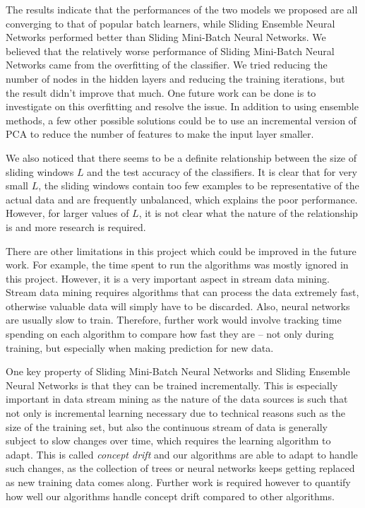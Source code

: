 \documentclass[conference]{IEEEtran}
\begin{document}
		The results indicate that the performances of the two models we proposed are all converging to that of popular batch learners, while Sliding Ensemble Neural Networks performed better than Sliding Mini-Batch Neural Networks. We believed that the relatively worse performance of  Sliding Mini-Batch Neural Networks came from the overfitting of the classifier. We tried reducing the number of nodes in the hidden layers and reducing the training iterations, but the result didn't improve that much. One future work can be done is to investigate on this overfitting and resolve the issue. In addition to using ensemble methods, a few other possible solutions could be to use an incremental version of PCA to reduce the number of features to make the input layer smaller.
		
		We also noticed that there seems to be a definite relationship between the size of sliding windows $L$ and the test accuracy of the classifiers. It is clear that for very small $L$, the sliding windows contain too few examples to be representative of the actual data and are frequently unbalanced, which explains the poor performance. However, for larger values of $L$, it is not clear what the nature of the relationship is and more research is required.
		
		There are other limitations in this project which could be improved in the future work. For example, the time spent to run the algorithms was mostly ignored in this project. However, it is a very important aspect in stream data mining. Stream data mining requires algorithms that can process the data extremely fast, otherwise valuable data will simply have to be discarded. Also, neural networks are usually slow to train. Therefore, further work would involve tracking time spending on each algorithm to compare how fast they are -- not only during training, but especially when making prediction for new data.
		
		
		One key property of   Sliding Mini-Batch Neural Networks and Sliding Ensemble Neural Networks is that they can be trained incrementally. This is especially important in data stream mining as the nature of the data sources is such that not only is incremental learning necessary due to technical reasons such as the size of the training set, but also the continuous stream of data is generally subject to slow changes over time, which requires the learning algorithm to adapt. This is called \emph{concept drift} and our algorithms are able to adapt to handle such changes, as the collection of trees or neural networks keeps getting replaced as new training data comes along. Further work is required however to quantify how well our algorithms handle concept drift compared to other algorithms.
		
\end{document}
